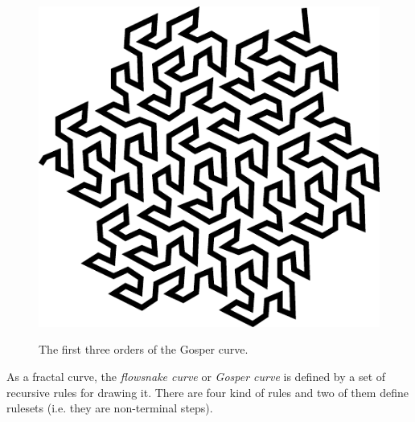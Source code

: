 \documentclass[12pt,openany,a4,usenames,dvipsnames]{book}
\begin{document}
\begin{figure}[H]
\begin{minipage}{\textwidth}
\begin{minipage}{0.30\textwidth}
    \hfill
  \end{minipage}
  \hspace{0.028\textwidth}
  \begin{minipage}{0.30\textwidth}
    \hfill
    \includegraphics[width=\textwidth,keepaspectratio]{figures/gosper3.pdf}
    \hfill
  \end{minipage}
  \end{minipage}\par
  \vspace{1em}
  {\noindent{}The first three orders of the Gosper curve.}
\end{figure}
As a fractal curve, the \emph{flowsnake curve} or \emph{Gosper curve} is defined by a set of recursive rules for drawing it. There are four kind of rules and two of them define rulesets (i.e. they are non-terminal steps).
\end{document}
